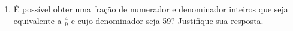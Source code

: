 \documentclass[a4paper,14pt]{article}
\begin{document}
\begin{multicols}{2}
\begin{enumerate}
			\item É possível obter uma fração de numerador e denominador inteiros que seja equivalente a $\frac{4}{9}$ e cujo denominador seja 59? Justifique sua resposta.  \\\\\\\\\\\\
		\end{enumerate}
		$~$ \\ $~$ \\ $~$ \\ $~$ \\ $~$ \\ $~$ \\ $~$ \\ $~$ \\ $~$ \\ $~$ \\ $~$ \\ $~$ \\ $~$ \\ $~$ \\ $~$ \\ $~$ \\ $~$ \\ $~$ \\ $~$ \\ $~$ \\ $~$ \\ $~$ \\ $~$ \\ $~$ \\ $~$ \\ $~$ \\ $~$ \\ $~$ \\ $~$
	\end{multicols}
\end{document}
